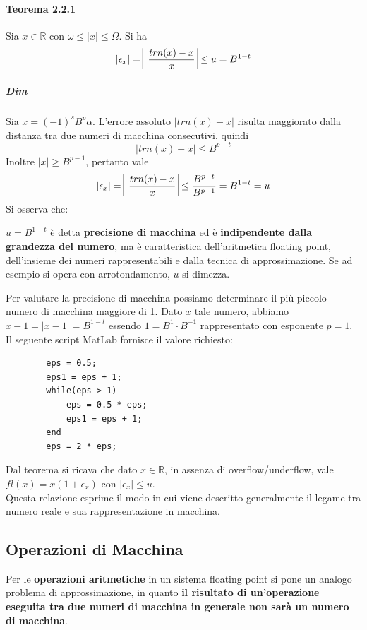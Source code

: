 \documentclass[10pt]{book}
\begin{document}
\paragraph{Teorema 2.2.1} Sia $x \in \mathbb{R}$ con $\omega \leq |x| \leq \Omega$. Si ha $$|\epsilon_x| = \:\vline\:\frac{trn(x) - x}{x}\:\vline \leq u = B^{1-t}$$
\subparagraph{Dim} Sia $x = (-1)^sB^p\alpha$. L'errore assoluto $|trn(x) - x|$ risulta maggiorato dalla distanza tra due numeri di macchina consecutivi, quindi $$|trn(x) - x|\leq B^{p-t}$$ Inoltre $|x| \geq B^{p-1}$, pertanto vale $$|\epsilon_x| = \:\vline\:\frac{trn(x) - x}{x}\:\vline \leq \frac{B^{p-t}}{B^{p-1}} = B^{1-t} = u$$
Si osserva che:
\begin{list}{}{}
	\item $u = B^{1-t}$ è detta \textbf{precisione di macchina} ed è \textbf{indipendente dalla grandezza del numero}, ma è caratteristica dell'aritmetica floating point, dell'insieme dei numeri rappresentabili e dalla tecnica di approssimazione. Se ad esempio si opera con arrotondamento, $u$ si dimezza.
	\item Per valutare la precisione di macchina possiamo determinare il più piccolo numero di macchina maggiore di 1. Dato $x$ tale numero, abbiamo $x - 1 = |x - 1| = B^{1-t}$ essendo $1 = B^1 \cdot B^{-1}$ rappresentato con esponente $p = 1$. Il seguente script MatLab fornisce il valore richiesto:
	\begin{lstlisting}
		eps = 0.5;
		eps1 = eps + 1;
		while(eps > 1)
			eps = 0.5 * eps;
			eps1 = eps + 1;
		end
		eps = 2 * eps;
	\end{lstlisting}
	\item Dal teorema si ricava che dato $x \in \mathbb{R}$, in assenza di overflow/underflow, vale $fl(x) = x(1 + \epsilon_x)$ con $|\epsilon_x| \leq u$.\\
	Questa relazione esprime il modo in cui viene descritto generalmente il legame tra numero reale e sua rappresentazione in macchina.
\end{list}
\subsection{Operazioni di Macchina}
Per le \textbf{operazioni aritmetiche} in un sistema floating point si pone un analogo problema di approssimazione, in quanto \textbf{il risultato di un'operazione eseguita tra due numeri di macchina in generale non sarà un numero di macchina}.
\end{document}
